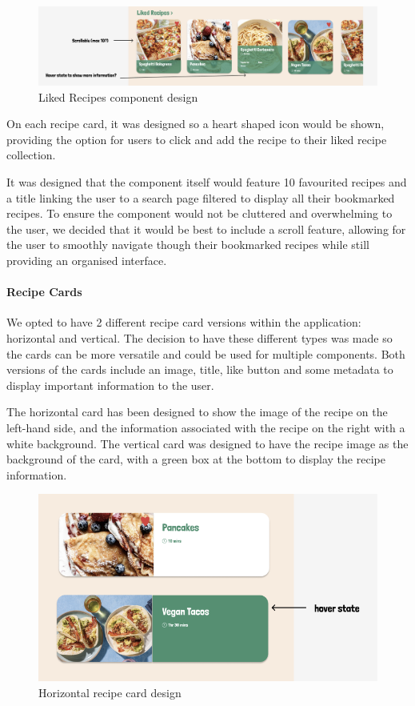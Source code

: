 \documentclass{article}
\begin{document}
\begin{figure}[h]
  \includegraphics[width=1.0\textwidth]{assets/design-images/Version 1 Liked Recipes.png}
  \centering
  \caption{Liked Recipes component design}
\end{figure}

On each recipe card, it was designed so a heart shaped icon would be shown,
providing the option for users to click and add the recipe to their liked
recipe collection.

It was designed that the component itself would feature 10 favourited recipes
and a title linking the user to a search page filtered to display all their
bookmarked recipes. To ensure the component would not be cluttered and
overwhelming to the user, we decided that it would be best to include a scroll
feature, allowing for the user to smoothly navigate though their bookmarked
recipes while still providing an organised interface.

\paragraph{Recipe Cards}
We opted to have 2 different recipe card versions within the application:
horizontal and vertical. The decision to have these different types was made so
the cards can be more versatile and could be used for multiple components. Both
versions of the cards include an image, title, like button and some metadata to
display important information to the user.

The horizontal card has been designed to show the image of the recipe on the
left-hand side, and the information associated with the recipe on the right
with a white background. The vertical card was designed to have the recipe
image as the background of the card, with a green box at the bottom to display
the recipe information.

\begin{figure}[h]
  \includegraphics[width=1.0\textwidth]{assets/design-images/Version 1 Horizontal Cards.png}
  \centering
  \caption{Horizontal recipe card design}
\end{figure}
\end{document}

